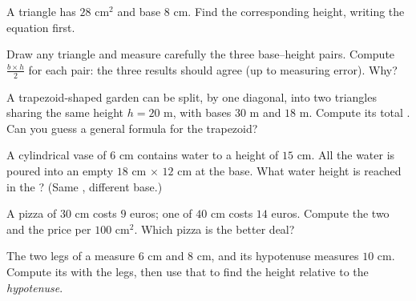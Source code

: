 \begin{exercise}[$\star$]\label{exo:g7:areas:7}
A triangle has  $28$ cm$^2$ and base $8$ cm. Find the
corresponding height, writing the equation first.
\end{exercise}

\begin{exercise}[$\star\star$]\label{exo:g7:areas:8}
Draw any triangle and measure carefully the three base--height pairs.
Compute $\frac{b \times h}{2}$ for each pair: the three results should
agree (up to measuring error). Why?
\end{exercise}

\begin{exercise}[$\star\star$]\label{exo:g7:areas:9}
A trapezoid-shaped garden can be split, by one diagonal, into two
triangles sharing the same height $h = 20$ m, with bases $30$ m and
$18$ m. Compute its total . Can you guess a general formula for
the trapezoid?
\end{exercise}

\begin{exercise}[$\star\star$]\label{exo:g7:areas:10}
A cylindrical vase of  $6$ cm contains water to a height of
$15$ cm. All the water is poured into an empty 
$18$ cm $\times$ $12$ cm at the base. What water height is reached in
the ? (Same , different base.)
\end{exercise}

\begin{exercise}[$\star\star$]\label{exo:g7:areas:11}
A pizza of  $30$ cm costs $9$ euros; one of  $40$ cm
costs $14$ euros. Compute the two  and the price per $100$
cm$^2$. Which pizza is the better deal?
\end{exercise}

\begin{exercise}[$\star\star\star$]\label{exo:g7:areas:12}
The two legs of a  measure $6$ cm and $8$ cm, and its
hypotenuse measures $10$ cm. Compute its  with the legs, then use
that  to find the height relative to the \emph{hypotenuse}.
\end{exercise}

